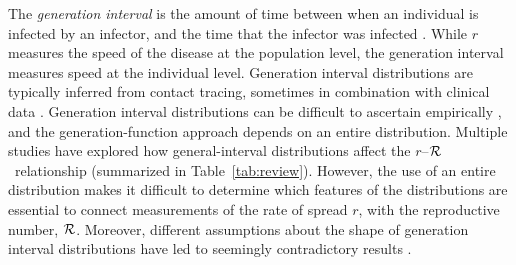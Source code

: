 \documentclass[12pt]{article}
\newcommand{\rR}{\mbox{$r$--$\cal R$}}
\newcommand{\RR}{\ensuremath{{\cal R}}}
\newcommand{\tref}[1]{Table~\ref{tab:#1}}
\begin{document}
The \emph{generation interval} is the amount of time between when an individual is infected by an infector, and the time that the infector was infected \cite{Sven07}.
While $r$ measures the speed of the disease at the population level, the generation interval measures speed at the individual level.
Generation interval distributions are typically inferred from contact tracing, sometimes in combination with clinical data \cite{AylwBarb14,LessOtt16,HubeJohn16}.
Generation interval distributions can be difficult to ascertain empirically \cite{NishCast09,ChamDush15}, and the generation-function approach depends on an entire distribution.
Multiple studies have explored how general-interval distributions affect the \rR\ relationship (summarized in \tref{review}).
However, the use of an entire distribution makes it difficult to determine which features of the distributions are essential to connect measurements of the rate of spread $r$, with the reproductive number, \RR.
Moreover,  different assumptions about the shape of generation interval distributions have led to seemingly contradictory results \cite{wearing2005appropriate, roberts2007model}.
\end{document}
